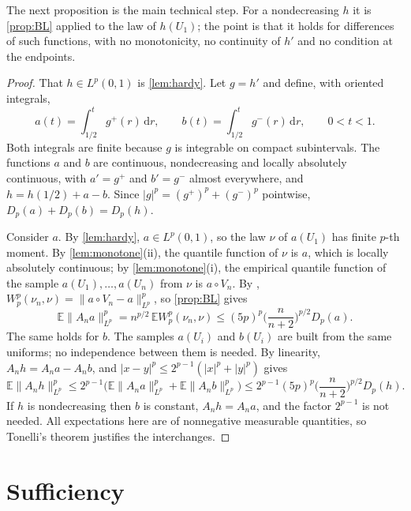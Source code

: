 \documentclass[11pt]{amsart}
\newtheorem{proposition}[theorem]{Proposition}
\theoremstyle{remark}
\newcommand{\E}{\mathbb{E}}
\newcommand{\dd}{\,\mathrm{d}}
\newcommand{\Lp}{L^p(0,1)}
\begin{document}
The next proposition is the main technical step. For a nondecreasing $h$ it is \cref{prop:BL} applied to the law of $h(U_1)$; the point is that it holds for differences of such functions, with no monotonicity, no continuity of $h'$ and no condition at the endpoints.


\begin{proof}
That $h\in\Lp$ is \cref{lem:hardy}. Let $g=h'$ and define, with oriented integrals,
\[
a(t)=\int_{1/2}^tg^+(r)\dd r,\qquad b(t)=\int_{1/2}^tg^-(r)\dd r,\qquad 0<t<1 .
\]
Both integrals are finite because $g$ is integrable on compact subintervals. The functions $a$ and $b$ are continuous, nondecreasing and locally absolutely continuous, with $a'=g^+$ and $b'=g^-$ almost everywhere, and $h=h(1/2)+a-b$. Since $|g|^p=(g^+)^p+(g^-)^p$ pointwise, $D_p(a)+D_p(b)=D_p(h)$.

Consider $a$. By \cref{lem:hardy}, $a\in\Lp$, so the law $\nu$ of $a(U_1)$ has finite $p$-th moment. By \cref{lem:monotone}(ii), the quantile function of $\nu$ is $a$, which is locally absolutely continuous; by \cref{lem:monotone}(i), the empirical quantile function of the sample $a(U_1),\dots,a(U_n)$ from $\nu$ is $a\circ V_n$. By \cite[Theorem~2.10]{BobkovLedoux2019}, $W_p^p(\nu_n,\nu)=\|a\circ V_n-a\|_{L^p}^p$, so \cref{prop:BL} gives
\[
\E\|A_na\|_{L^p}^p=n^{p/2}\,\E W_p^p(\nu_n,\nu)\le(5p)^p\Big(\frac n{n+2}\Big)^{p/2}D_p(a).
\]
The same holds for $b$. The samples $a(U_i)$ and $b(U_i)$ are built from the same uniforms; no independence between them is needed. By linearity, $A_nh=A_na-A_nb$, and $|x-y|^p\le2^{p-1}(|x|^p+|y|^p)$ gives
\[
\E\|A_nh\|_{L^p}^p\le2^{p-1}\big(\E\|A_na\|_{L^p}^p+\E\|A_nb\|_{L^p}^p\big)\le2^{p-1}(5p)^p\Big(\frac n{n+2}\Big)^{p/2}D_p(h).
\]
If $h$ is nondecreasing then $b$ is constant, $A_nh=A_na$, and the factor $2^{p-1}$ is not needed. All expectations here are of nonnegative measurable quantities, so Tonelli's theorem justifies the interchanges.
\end{proof}

\section{Sufficiency}\label{sec:sufficiency}
\end{document}
